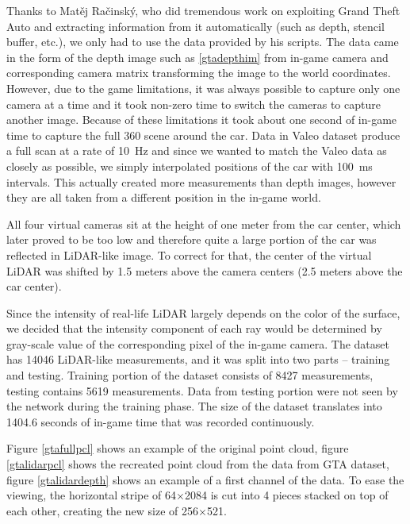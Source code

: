 Thanks to Matěj Račinský, who did tremendous work on exploiting Grand Theft Auto and extracting information from it automatically (such as depth, stencil buffer, etc.), we only had to use the data provided by his scripts. The data came in the form of the depth image such as \ref{gtadepthim} from in-game camera and corresponding camera matrix transforming the image to the world coordinates. However, due to the game limitations, it was always possible to capture only one camera at a time and it took non-zero time to switch the cameras to capture another image. Because of these limitations it took about one second of in-game time to capture the full 360\degree{} scene around the car. Data in Valeo dataset produce a full scan at a rate of 10~Hz and since we wanted to match the Valeo data as closely as possible, we simply interpolated positions of the car with 100~ms intervals. This actually created more measurements than depth images, however they are all taken from a different position in the in-game world.

All four virtual cameras sit at the height of one meter from the car center, which later proved to be too low and therefore quite a large portion of the car was reflected in LiDAR-like image. To correct for that, the center of the virtual LiDAR was shifted by 1.5 meters above the camera centers (2.5 meters above the car center).

Since the intensity of real-life LiDAR largely depends on the color of the surface, we decided that the intensity component of each ray would be determined by gray-scale value of the corresponding pixel of the in-game camera. The dataset has 14046 LiDAR-like measurements, and it was split into two parts -- training and testing. Training portion of the dataset consists of 8427 measurements, testing contains 5619 measurements. Data from testing portion were not seen by the network during the training phase. The size of the dataset translates into 1404.6 seconds of in-game time that was recorded continuously.

Figure \ref{gtafullpcl} shows an example of the original point cloud, figure \ref{gtalidarpcl} shows the recreated point cloud from the data from GTA dataset, figure \ref{gtalidardepth} shows an example of a first channel of the data. To ease the viewing, the horizontal stripe of 64$\times$2084 is cut into 4 pieces stacked on top of each other, creating the new size of 256$\times$521.

